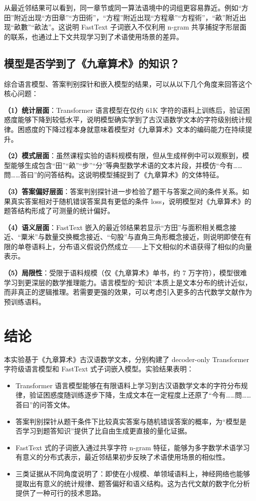 \documentclass[UTF8,a4paper,twocolumn]{ctexart}
\begin{document}
从最近邻结果可以看到，同一章节或同一算法语境中的词组更容易靠近。例如“方田”附近出现“方田章”“方田術”，“方程”附近出现“方程章”“方程術”，“畝”附近出现“畝數”“畝法”。这说明 FastText 子词嵌入不仅利用 n-gram 共享捕捉字形层面的联系，也通过上下文共现学习到了术语使用场景的差异。

\subsection{模型是否学到了《九章算术》的知识？}

综合语言模型、答案判别探针和嵌入模型的结果，可以从以下几个角度来回答这个核心问题：

\textbf{（1）统计层面}：Transformer 语言模型在仅约 61K 字符的语料上训练后，验证困惑度能够下降到较低水平，说明模型确实学到了古汉语数学文本的字符级别统计规律。困惑度的下降过程本身就意味着模型对《九章算术》文本的编码能力在持续提升。

\textbf{（2）模式层面}：虽然课程实验的语料规模有限，但从生成样例中可以观察到，模型能够生成包含“田”“畝”“步”“分”等典型数学术语的文本片段，并模仿“今有……問……荅曰”的问答结构。这说明模型捕捉到了《九章算术》的文体特征。

\textbf{（3）答案偏好层面}：答案判别探针进一步检验了题干与答案之间的条件关系。如果真实答案相对于随机错误答案具有更低的条件 loss，说明模型对《九章算术》的题答结构形成了可测量的统计偏好。

\textbf{（4）语义层面}：FastText 嵌入的最近邻结果若显示“方田”与面积相关概念接近、“粟米”与数量交换概念接近、“句股”与直角三角形概念接近，则说明即使在有限的单卷语料上，分布语义假说仍然成立——上下文相似的术语获得了相似的向量表示。

\textbf{（5）局限性}：受限于语料规模（仅《九章算术》单书，约 7 万字符），模型很难学习到更深层的数学推理能力。语言模型的“知识”本质上是文本分布的统计近似，而非真正的逻辑推理。若需要更强的效果，可以考虑引入更多的古代数学文献作为预训练语料。

\section{结论}

本实验基于《九章算术》古汉语数学文本，分别构建了 decoder-only Transformer 字符级语言模型和 FastText 式子词嵌入模型。实验结果表明：

\begin{itemize}
\item Transformer 语言模型能够在有限语料上学习到古汉语数学文本的字符分布规律，验证困惑度随训练逐步下降，生成文本在一定程度上还原了“今有……問……荅曰”的问答文体。
\item 答案判别探针从题干条件下比较真实答案与随机错误答案的概率，为“模型是否学习到题答知识”提供了比自由生成更直接的量化证据。
\item FastText 式的子词嵌入通过共享字符 n-gram 特征，能够为多字数学术语学习有意义的分布式表示，最近邻结果初步反映了术语使用场景的相似性。
\item 三类证据从不同角度说明了：即使在小规模、单领域语料上，神经网络也能够提取出有意义的统计规律、题答偏好和语义结构。这为古代文献的数字化分析提供了一种可行的技术思路。
\end{itemize}
\end{document}
